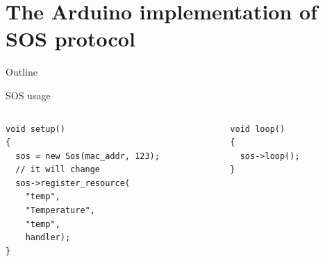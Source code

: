 \section {The Arduino implementation of SOS protocol}
\begin{frame} {Outline}
    \tableofcontents [current]
\end{frame}

\begin{frame}[containsverbatim]{SOS usage}
	\begin{columns}[c]
		\begin{column}[c]{.6\textwidth}
\begin{Verbatim}[fontsize=\scriptsize]
void setup() 
{
  sos = new Sos(mac_addr, 123);
  // it will change
  sos->register_resource(
    "temp",
    "Temperature",
    "temp",
    handler);
}
\end{Verbatim}
		\end{column}
		\begin{column}[c]{.4\textwidth}
\begin{Verbatim}[fontsize=\scriptsize]
void loop() 
{
  sos->loop();
}
\end{Verbatim}
		\end{column}
	\end{columns}
\end{frame}

